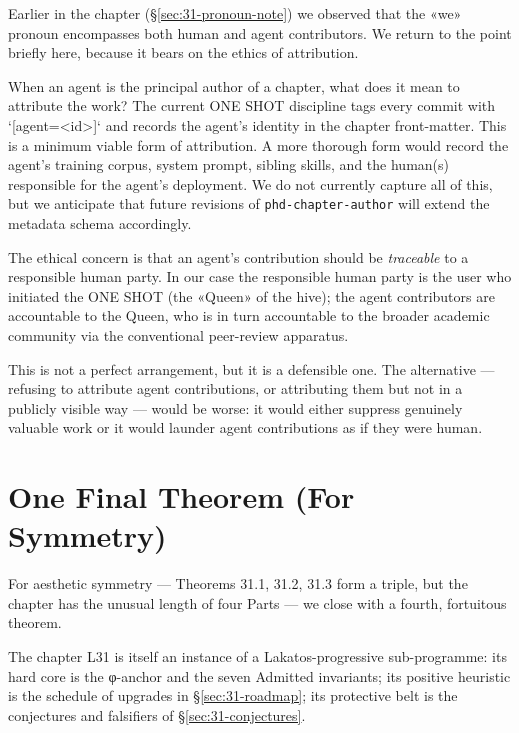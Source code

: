 Earlier in the chapter (§\ref{sec:31-pronoun-note}) we observed that the «we» pronoun encompasses both human and agent contributors. We return to the point briefly here, because it bears on the ethics of attribution.

When an agent is the principal author of a chapter, what does it mean to attribute the work? The current ONE SHOT discipline tags every commit with `[agent=<id>]` and records the agent's identity in the chapter front-matter. This is a minimum viable form of attribution. A more thorough form would record the agent's training corpus, system prompt, sibling skills, and the human(s) responsible for the agent's deployment. We do not currently capture all of this, but we anticipate that future revisions of \texttt{phd-chapter-author} will extend the metadata schema accordingly.

The ethical concern is that an agent's contribution should be \emph{traceable} to a responsible human party. In our case the responsible human party is the user who initiated the ONE SHOT (the «Queen» of the hive); the agent contributors are accountable to the Queen, who is in turn accountable to the broader academic community via the conventional peer-review apparatus.

This is not a perfect arrangement, but it is a defensible one. The alternative — refusing to attribute agent contributions, or attributing them but not in a publicly visible way — would be worse: it would either suppress genuinely valuable work or it would launder agent contributions as if they were human.

\section{One Final Theorem (For Symmetry)}
\label{sec:31-thm-symmetry}

For aesthetic symmetry — Theorems 31.1, 31.2, 31.3 form a triple, but the chapter has the unusual length of four Parts — we close with a fourth, fortuitous theorem.

\begin{theorem}
\label{thm:31-4-self-reference}
The chapter L31 is itself an instance of a Lakatos-progressive sub-programme: its hard core is the φ-anchor and the seven Admitted invariants; its positive heuristic is the schedule of upgrades in §\ref{sec:31-roadmap}; its protective belt is the conjectures and falsifiers of §\ref{sec:31-conjectures}.
\end{theorem}

